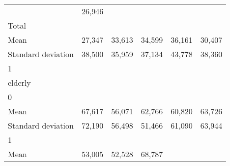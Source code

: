 \begin{tabular}{llllll}
  \multicolumn{1}{r}{} &
  \multicolumn{1}{r}{26,946} \\
\multicolumn{1}{l}{\hspace{3em}Total} &
  \multicolumn{1}{|r}{} &
  \multicolumn{1}{r}{} &
  \multicolumn{1}{r}{} &
  \multicolumn{1}{r}{} &
  \multicolumn{1}{r}{} \\
\multicolumn{1}{l}{\hspace{4em}Mean} &
  \multicolumn{1}{|r}{27,347} &
  \multicolumn{1}{r}{33,613} &
  \multicolumn{1}{r}{34,599} &
  \multicolumn{1}{r}{36,161} &
  \multicolumn{1}{r}{30,407} \\
\multicolumn{1}{l}{\hspace{4em}Standard deviation} &
  \multicolumn{1}{|r}{38,500} &
  \multicolumn{1}{r}{35,959} &
  \multicolumn{1}{r}{37,134} &
  \multicolumn{1}{r}{43,778} &
  \multicolumn{1}{r}{38,360} \\
\multicolumn{1}{l}{\hspace{1em}1} &
  \multicolumn{1}{|r}{} &
  \multicolumn{1}{r}{} &
  \multicolumn{1}{r}{} &
  \multicolumn{1}{r}{} &
  \multicolumn{1}{r}{} \\
\multicolumn{1}{l}{\hspace{2em}elderly} &
  \multicolumn{1}{|r}{} &
  \multicolumn{1}{r}{} &
  \multicolumn{1}{r}{} &
  \multicolumn{1}{r}{} &
  \multicolumn{1}{r}{} \\
\multicolumn{1}{l}{\hspace{3em}0} &
  \multicolumn{1}{|r}{} &
  \multicolumn{1}{r}{} &
  \multicolumn{1}{r}{} &
  \multicolumn{1}{r}{} &
  \multicolumn{1}{r}{} \\
\multicolumn{1}{l}{\hspace{4em}Mean} &
  \multicolumn{1}{|r}{67,617} &
  \multicolumn{1}{r}{56,071} &
  \multicolumn{1}{r}{62,766} &
  \multicolumn{1}{r}{60,820} &
  \multicolumn{1}{r}{63,726} \\
\multicolumn{1}{l}{\hspace{4em}Standard deviation} &
  \multicolumn{1}{|r}{72,190} &
  \multicolumn{1}{r}{56,498} &
  \multicolumn{1}{r}{51,466} &
  \multicolumn{1}{r}{61,090} &
  \multicolumn{1}{r}{63,944} \\
\multicolumn{1}{l}{\hspace{3em}1} &
  \multicolumn{1}{|r}{} &
  \multicolumn{1}{r}{} &
  \multicolumn{1}{r}{} &
  \multicolumn{1}{r}{} &
  \multicolumn{1}{r}{} \\
\multicolumn{1}{l}{\hspace{4em}Mean} &
  \multicolumn{1}{|r}{53,005} &
  \multicolumn{1}{r}{52,528} &
  \multicolumn{1}{r}{68,787} &

\end{tabular}
